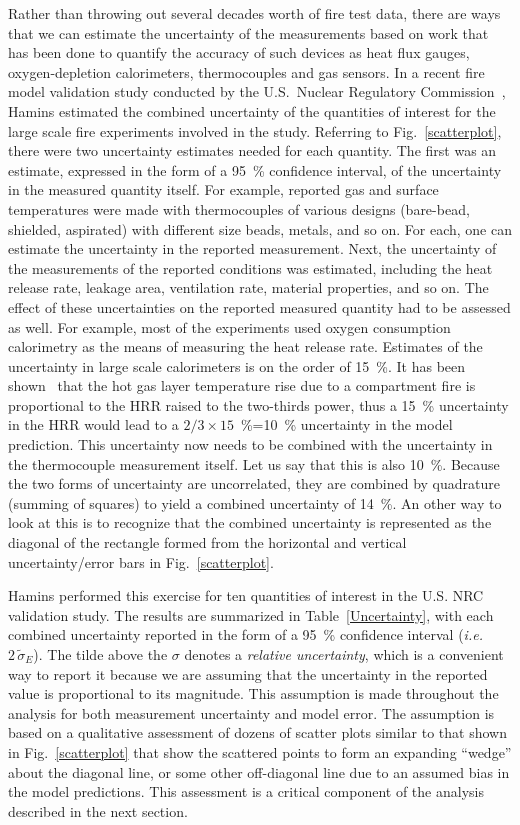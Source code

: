 Rather than throwing out several decades worth of fire test data, there are ways that we can estimate the uncertainty of the measurements based on work
that has been done to quantify the accuracy of such devices as heat flux gauges, oxygen-depletion calorimeters, thermocouples and gas sensors.
In a recent fire model validation study conducted by the U.S.~Nuclear Regulatory Commission~\cite{NUREG_1824}, Hamins estimated the combined
uncertainty of the quantities of interest for the large scale fire experiments involved in the study. Referring to Fig.~\ref{scatterplot}, there were
two uncertainty estimates needed for each quantity. The first was an estimate, expressed in the form of a 95~\% confidence interval, of the
uncertainty in the measured quantity itself. For example, reported gas and surface temperatures were made with thermocouples of various designs (bare-bead,
shielded, aspirated) with different size beads, metals, and so on. For each, one can estimate the uncertainty in the reported measurement. Next, the
uncertainty of the measurements of the reported conditions was estimated, including the heat release rate, leakage area, ventilation rate, material
properties, and so on. The effect of these uncertainties on the reported measured quantity had to be assessed as well. For example, most of the
experiments used oxygen consumption calorimetry as the means of measuring the heat release rate.
Estimates of the uncertainty in large scale calorimeters is on the order of 15~\%. It has been shown~\cite{SFPE:Walton} that the hot gas layer temperature rise due to
a compartment fire is proportional to the HRR raised to the two-thirds power, thus a 15~\% uncertainty in the HRR would lead to a $2/3 \times 15$~\%=10~\%
uncertainty in the model prediction. This uncertainty now needs to be combined with the uncertainty in the thermocouple measurement itself. Let us say that
this is also 10~\%. Because the two forms of uncertainty are uncorrelated, they are combined by quadrature (summing of squares) to yield a combined
uncertainty of 14~\%. An other way to look at this is to recognize that the combined uncertainty is represented as the diagonal of the rectangle formed
from the horizontal and vertical uncertainty/error bars in Fig.~\ref{scatterplot}.

Hamins performed this exercise for ten quantities of interest in the U.S. NRC validation study. The results are summarized in Table~\ref{Uncertainty}, with
each combined uncertainty reported in the form of a 95~\% confidence interval ({\em i.e.} $2 \, \widetilde{\sigma}_E$). The tilde above the $\sigma$ denotes a
{\em relative uncertainty}, which is a convenient way to report it because we are assuming that the uncertainty in the reported value is proportional to
its magnitude. This assumption is made throughout the analysis for both measurement uncertainty and model error. The assumption is based on a
qualitative assessment of dozens of scatter plots similar to that shown in Fig.~\ref{scatterplot} that show the scattered points to form an expanding ``wedge''
about the diagonal line, or some other off-diagonal line due to an assumed bias in the model predictions. This assessment is a critical component of the
analysis described in the next section.

